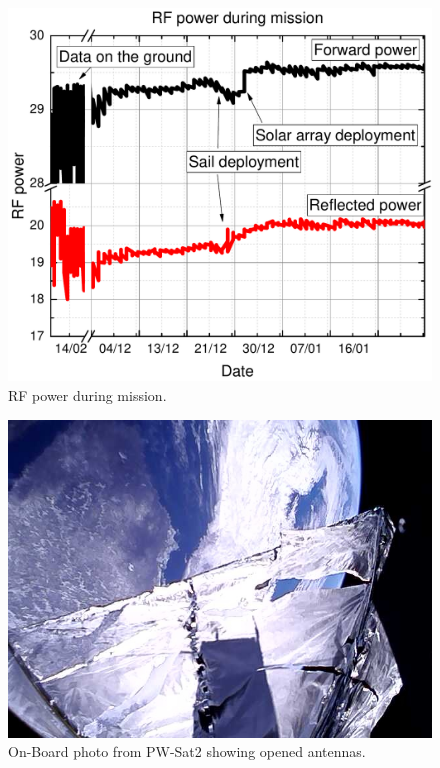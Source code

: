 \begin{figure}
    \centering
    \includegraphics[width=0.6\paperwidth]{img/6/rf_power_comm.pdf}
    \caption{RF power during mission.}
    \label{4_rf_power_comm}
\end{figure}

\begin{figure}
    \centering
    \includegraphics[width=0.7\paperwidth]{img/6/antennas_deployed_orbit.jpg}
    \caption{On-Board photo from PW-Sat2 showing opened antennas.}
    \label{antennas_deployed_orbit}
\end{figure}


